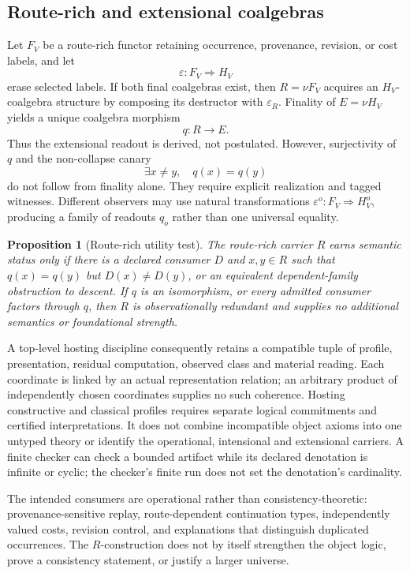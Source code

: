 \documentclass[11pt]{article}
\newtheorem{proposition}[theorem]{Proposition}
\theoremstyle{definition}
\theoremstyle{remark}
\begin{document}
\subsection{Route-rich and extensional coalgebras}

Let $F_V$ be a route-rich functor retaining occurrence, provenance, revision, or
cost labels, and let
\[
  \varepsilon:F_V\Longrightarrow H_V
\]
erase selected labels.  If both final coalgebras exist, then
$R=\nu F_V$ acquires an $H_V$-coalgebra structure by composing its destructor
with $\varepsilon_R$.  Finality of $E=\nu H_V$ yields a unique coalgebra morphism
\[
  q:R\longrightarrow E.                                  \tag{2}
\]
Thus the extensional readout is derived, not postulated.  However, surjectivity of
$q$ and the non-collapse canary
\[
  \exists x\ne y,\quad q(x)=q(y)                          \tag{3}
\]
do not follow from finality alone.  They require explicit realization and tagged
witnesses.  Different observers may use natural transformations
$\varepsilon^o:F_V\Rightarrow H^o_V$, producing a family of readouts $q_o$ rather
than one universal equality.

\begin{proposition}[Route-rich utility test]
The route-rich carrier $R$ earns semantic status only if there is a declared
consumer $D$ and $x,y\in R$ such that $q(x)=q(y)$ but $D(x)\ne D(y)$, or an
equivalent dependent-family obstruction to descent.  If $q$ is an isomorphism, or
every admitted consumer factors through $q$, then $R$ is observationally
redundant and supplies no additional semantics or foundational strength.
\end{proposition}


A top-level hosting discipline consequently retains a compatible tuple of
profile, presentation, residual computation, observed class and material
reading. Each coordinate is linked by an actual representation relation;
an arbitrary product of independently chosen coordinates supplies no such
coherence. Hosting constructive and classical profiles requires separate
logical commitments and certified interpretations. It does not combine
incompatible object axioms into one untyped theory or identify the
operational, intensional and extensional carriers. A finite checker can
check a bounded artifact while its declared denotation is infinite or
cyclic; the checker's finite run does not set the denotation's cardinality.

The intended consumers are operational rather than consistency-theoretic:
provenance-sensitive replay, route-dependent continuation types, independently
valued costs, revision control, and explanations that distinguish duplicated
occurrences.  The $R$-construction does not by itself strengthen the object
logic, prove a consistency statement, or justify a larger universe.
\end{document}
